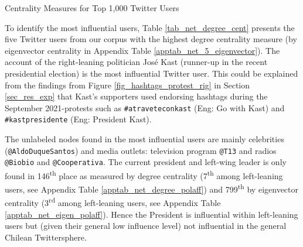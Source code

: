         \begin{table}[!htb]
                \centering
                
                
                
                \caption{Centrality Measures for Top 1,000 Twitter Users}
                
                
                \label{tab_net_meas}
            \end{table}
    
        To identify the most influential users, Table \ref{tab_net_degree_cent} presents the five Twitter users from our corpus with the highest degree centrality measure (by eigenvector centrality in Appendix Table \ref{apptab_net_5_eigenvector}). The account of the right-leaning politician José Kast (runner-up in the recent presidential election) is the most influential Twitter user. This could be explained from the findings from Figure \ref{fig_hashtags_protest_rig} in Section \ref{sec_res_exp} that Kast's supporters used endorsing hashtags during the September 2021-protests such as \texttt{\#atraveteconkast} (Eng: Go with Kast) and \texttt{\#kastpresidente} (Eng: President Kast).
        
        The unlabeled nodes found in the most influential users are mainly celebrities (\texttt{@AldoDuqueSantos}) and media outlets: television program \texttt{@T13} and radios \texttt{@Biobio} and \texttt{@Cooperativa}. The current president and left-wing leader is only found in 146\textsuperscript{th} place as measured by degree centrality (7\textsuperscript{th} among left-leaning users, see Appendix Table \ref{apptab_net_degree_polaff}) and 799\textsuperscript{th} by eigenvector centrality (3\textsuperscript{rd} among left-leaning users, see Appendix Table \ref{apptab_net_eigen_polaff}). Hence the President is influential within left-leaning users but (given their general low influence level) not influential in the general Chilean Twittersphere.
        
